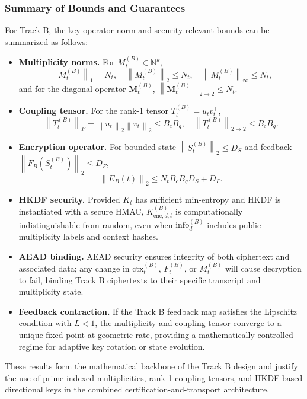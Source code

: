 \documentclass[11pt]{article}
\newcommand{\N}{\mathbb{N}}
\newcommand{\norm}[1]{\left\lVert #1 \right\rVert}
\begin{document}
\subsubsection{Summary of Bounds and Guarantees}

For Track B, the key operator norm and security-relevant bounds can be summarized as follows:

\begin{itemize}
  \item \textbf{Multiplicity norms.}
  For \(M_t^{(B)} \in \N^k\),
  \[
    \norm{M_t^{(B)}}_1 = N_t, \quad
    \norm{M_t^{(B)}}_2 \le N_t, \quad
    \norm{M_t^{(B)}}_\infty \le N_t,
  \]
  and for the diagonal operator \(\mathbf{M}_t^{(B)}\),
  \(\norm{\mathbf{M}_t^{(B)}}_{2\to2} \le N_t\).
  \item \textbf{Coupling tensor.}
  For the rank-1 tensor \(T_t^{(B)} = u_t v_t^\top\),
  \[
    \norm{T_t^{(B)}}_F = \norm{u_t}_2 \norm{v_t}_2 \le B_c B_q, \quad
    \norm{T_t^{(B)}}_{2\to2} \le B_c B_q.
  \]
  \item \textbf{Encryption operator.}
  For bounded state \(\norm{S_t^{(B)}}_2 \le D_S\) and feedback \(\norm{F_B(S_t^{(B)})}_2 \le D_F\),
  \[
    \norm{E_B(t)}_2 \le N_t B_c B_q D_S + D_F.
  \]
  \item \textbf{HKDF security.}
  Provided \(K_t\) has sufficient min-entropy and HKDF is instantiated with a secure HMAC, \(K_{\mathrm{enc},d,t}^{(B)}\) is computationally indistinguishable from random, even when \(\mathrm{info}_d^{(B)}\) includes public multiplicity labels and context hashes.\cite{HKDFWiki,GopherHKDF}
  \item \textbf{AEAD binding.}
  AEAD security ensures integrity of both ciphertext and associated data; any change in \(\mathrm{ctx}_t^{(B)}\), \(F_t^{(B)}\), or \(M_t^{(B)}\) will cause decryption to fail, binding Track B ciphertexts to their specific transcript and multiplicity state.
  \item \textbf{Feedback contraction.}
  If the Track B feedback map satisfies the Lipschitz condition with \(L<1\), the multiplicity and coupling tensor converge to a unique fixed point at geometric rate, providing a mathematically controlled regime for adaptive key rotation or state evolution.
\end{itemize}

These results form the mathematical backbone of the Track B design and justify the use of prime-indexed multiplicities, rank-1 coupling tensors, and HKDF-based directional keys in the combined certification-and-transport architecture.
\end{document}
